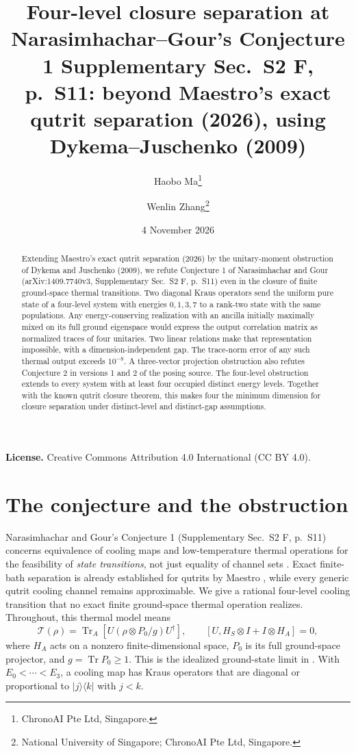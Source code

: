 \documentclass[11pt]{article}
\title{Four-level closure separation at Narasimhachar--Gour's Conjecture 1\newline
\large Supplementary Sec.\ S2 F, p.\ S11:\newline
beyond Maestro's exact qutrit separation (2026),\newline
using Dykema--Juschenko (2009)}
\author{Haobo Ma\thanks{ChronoAI Pte Ltd, Singapore.}\and
Wenlin Zhang\thanks{National University of Singapore; ChronoAI Pte Ltd, Singapore.}}
\date{4 November 2026}
\newcommand{\Tr}{\operatorname{Tr}}
\newcommand{\ket}[1]{\lvert #1\rangle}
\newcommand{\bra}[1]{\langle #1\rvert}
\begin{document}
\maketitle
\begin{abstract}
Extending Maestro's exact qutrit separation (2026) by the unitary-moment
obstruction of Dykema and Juschenko (2009),
we refute Conjecture 1 of Narasimhachar and Gour (arXiv:1409.7740v3,
Supplementary Sec.\ S2 F, p.\ S11) even in the closure of finite
ground-space thermal transitions. Two diagonal Kraus operators send the uniform pure state of a
four-level system with energies $0,1,3,7$ to a rank-two state with the same
populations. Any energy-conserving realization with an ancilla initially
maximally mixed on its full ground eigenspace would express the output
correlation matrix as normalized traces of four unitaries. Two linear
relations make that representation impossible, with a dimension-independent
gap. The trace-norm error of any such thermal output exceeds $10^{-8}$.
A three-vector projection obstruction also refutes Conjecture 2 in
versions 1 and 2 of the posing source. The four-level obstruction extends
to every system with at least four occupied distinct energy levels.
Together with the known qutrit closure theorem,
this makes four the minimum dimension for closure separation under
distinct-level and distinct-gap assumptions.
\end{abstract}
\noindent\textbf{License.} Creative Commons Attribution 4.0 International (CC BY 4.0).

\section{The conjecture and the obstruction}
Narasimhachar and Gour's Conjecture 1 (Supplementary Sec.\ S2 F, p.\ S11)
concerns equivalence of cooling maps
and low-temperature thermal operations for the feasibility of \emph{state
transitions}, not just equality of channel sets \cite[Sec.\ S2 F,
Conjecture 1]{NG}. Exact finite-bath separation is already established
for qutrits by Maestro \cite[Letter, first main result; Supplement,
pp.\ 1--2]{MA}, while every generic qutrit cooling channel remains
approximable. We give a rational four-level cooling transition that no exact finite
ground-space thermal operation realizes. Throughout, this thermal model means
\begin{equation}\label{eq:thermal}
\mathcal T(\rho)=\Tr_A\!\left[U(\rho\otimes P_0/g)U^\dagger\right],
\qquad [U,H_S\otimes I+I\otimes H_A]=0,
\end{equation}
where $H_A$ acts on a nonzero finite-dimensional space, $P_0$ is its full
ground-space projector, and $g=\Tr P_0\geq1$. This is the idealized ground-state
limit in \cite[main-text Eq.\ (6); Supplementary Sec.\ S2 A]{NG}.
With $E_0<\cdots<E_3$, a cooling map has Kraus operators that are diagonal
or proportional to $\ket j\bra k$ with $j<k$.
\end{document}
